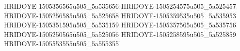 HRIDOYE-1505356565u505_5a535656
HRIDOYE-1505254575u505_5a525457
HRIDOYE-1505256585u505_5a525658
HRIDOYE-1505359535u505_5a535953
HRIDOYE-1505351595u505_5a535159
HRIDOYE-1505357565u505_5a535756
HRIDOYE-1505250565u505_5a525056
HRIDOYE-1505258595u505_5a525859
HRIDOYE-1505553555u505_5a555355
